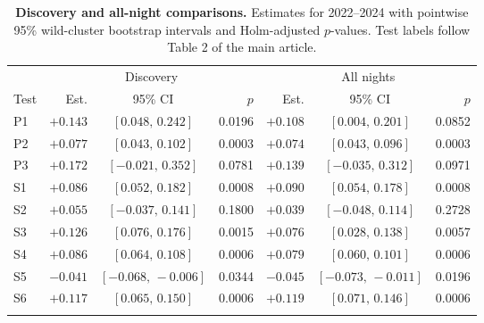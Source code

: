 \documentclass[pdflatex,sn-mathphys-num]{sn-jnl}
\begin{document}
\begin{table}[!htbp]
\caption{\textbf{Discovery and all-night comparisons.} Estimates for 2022--2024 with pointwise 95\% wild-cluster bootstrap intervals and Holm-adjusted $p$-values. Test labels follow Table 2 of the main article.}\label{tab:si-splits}
\begin{tabular*}{\textwidth}{@{\extracolsep\fill}lrcrrcr}
\toprule
 & \multicolumn{3}{c}{Discovery} & \multicolumn{3}{c}{All nights} \\
\cmidrule{2-4}\cmidrule{5-7}
Test & Est. & 95\% CI & $p$ & Est. & 95\% CI & $p$ \\
\midrule
P1 & $+0.143$ & $[0.048,\,0.242]$ & 0.0196 & $+0.108$ & $[0.004,\,0.201]$ & 0.0852 \\
P2 & $+0.077$ & $[0.043,\,0.102]$ & 0.0003 & $+0.074$ & $[0.043,\,0.096]$ & 0.0003 \\
P3 & $+0.172$ & $[-0.021,\,0.352]$ & 0.0781 & $+0.139$ & $[-0.035,\,0.312]$ & 0.0971 \\
S1 & $+0.086$ & $[0.052,\,0.182]$ & 0.0008 & $+0.090$ & $[0.054,\,0.178]$ & 0.0008 \\
S2 & $+0.055$ & $[-0.037,\,0.141]$ & 0.1800 & $+0.039$ & $[-0.048,\,0.114]$ & 0.2728 \\
S3 & $+0.126$ & $[0.076,\,0.176]$ & 0.0015 & $+0.076$ & $[0.028,\,0.138]$ & 0.0057 \\
S4 & $+0.086$ & $[0.064,\,0.108]$ & 0.0006 & $+0.079$ & $[0.060,\,0.101]$ & 0.0006 \\
S5 & $-0.041$ & $[-0.068,\,-0.006]$ & 0.0344 & $-0.045$ & $[-0.073,\,-0.011]$ & 0.0196 \\
S6 & $+0.117$ & $[0.065,\,0.150]$ & 0.0006 & $+0.119$ & $[0.071,\,0.146]$ & 0.0006 \\
\botrule
\end{tabular*}
\end{table}

\FloatBarrier

\end{document}
